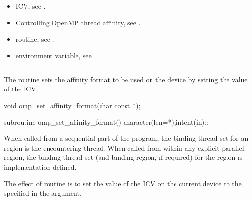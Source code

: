 \crossreferences
\begin{itemize}
\item {} ICV, see 
.

\item Controlling OpenMP thread affinity, see 
. 

\item {} routine, see 
.

\item {} environment variable, see 
.
\end{itemize}

\subsection{}
\label{subsec:omp_set_affinity_format}

\summary
The  routine sets the affinity format to be used on the device 
by setting the value of the  ICV. 

\format
\begin{ccppspecific}
\begin{boxedcode}
void omp\_set\_affinity\_format(char const *);
\end{boxedcode}
\end{ccppspecific}

\begin{fortranspecific}
\begin{boxedcode}
subroutine omp\_set\_affinity\_format()
character(len=*),intent(in)::
\end{boxedcode}
\end{fortranspecific}

\binding
When called from a sequential part of the program, the binding thread set for an 
 region is the encountering thread. When called 
from within any explicit parallel region, the binding thread set (and binding region, if 
required) for the  region is implementation defined. 

\effect
The effect of  routine is to set the value of 
the  ICV on the current device to the  specified 
in the argument.

